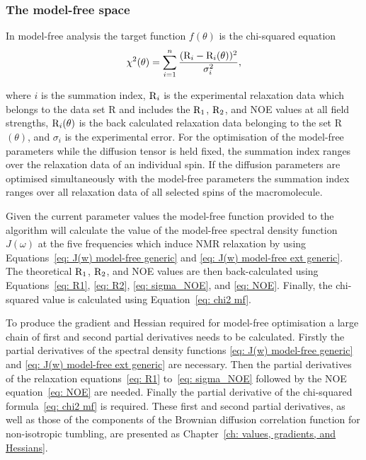 \begin{htmlonly}
\begin{htmlonly}
\subsubsection{The model-free space}

In model-free analysis the target function $f(\theta)$ is the chi-squared equation
\begin{equation} \label{eq: chi2 mf}
 \chi^2(\theta) = \sum_{i=1}^n \frac{(\mathrm{R}_i - \mathrm{R}_i(\theta))^2}{\sigma_i^2},
\end{equation}

\noindent where $i$ is the summation index, $\mathrm{R}_i$ is the experimental relaxation data which belongs to the data set R and includes the $\mathrm{R}_1$, $\mathrm{R}_2$, and NOE values at all field strengths, $\mathrm{R}_i(\theta)$ is the back calculated relaxation data belonging to the set R$(\theta)$, and $\sigma_i$ is the experimental error.
For the optimisation of the model-free parameters while the diffusion tensor is held fixed, the summation index ranges over the relaxation data of an individual spin.
If the diffusion parameters are optimised simultaneously with the model-free parameters the summation index ranges over all relaxation data of all selected spins of the macromolecule.

Given the current parameter values the model-free function provided to the algorithm will calculate the value of the model-free spectral density function $J(\omega)$ at the five frequencies which induce NMR relaxation by using Equations~\eqref{eq: J(w) model-free generic} and \eqref{eq: J(w) model-free ext generic}.
The theoretical $\mathrm{R}_1$, $\mathrm{R}_2$, and NOE values are then back-calculated using Equations~\eqref{eq: R1}, \eqref{eq: R2}, \eqref{eq: sigma_NOE}, and \eqref{eq: NOE}.
Finally, the chi-squared value is calculated using Equation~\eqref{eq: chi2 mf}.

To produce the gradient and Hessian required for model-free optimisation a large chain of first and second partial derivatives needs to be calculated.
Firstly the partial derivatives of the spectral density functions \eqref{eq: J(w) model-free generic} and \eqref{eq: J(w) model-free ext generic} are necessary.
Then the partial derivatives of the relaxation equations~\eqref{eq: R1} to~\eqref{eq: sigma_NOE} followed by the NOE equation~\eqref{eq: NOE} are needed.
Finally the partial derivative of the chi-squared formula~\eqref{eq: chi2 mf} is required.
These first and second partial derivatives, as well as those of the components of the Brownian diffusion correlation function for non-isotropic tumbling, are presented as Chapter~\ref{ch: values, gradients, and Hessians}.



\end{htmlonly}
\end{htmlonly}
